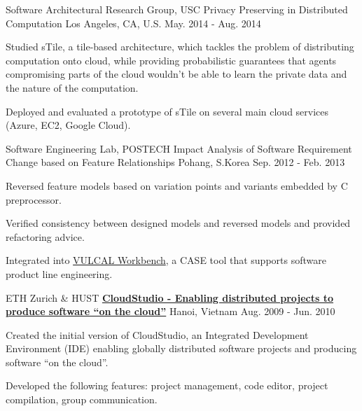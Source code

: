 \begin{cventries}
\cventry
{{Software Architectural Research Group}, USC} %
{Privacy Preserving in Distributed Computation} %
{Los Angeles, CA, U.S.} %
{May. 2014 - Aug. 2014} %
{
  	\begin{cvitems} %
  		\item Studied sTile, a tile-based architecture, which tackles the problem of distributing computation onto cloud, while providing probabilistic guarantees that agents compromising parts of the cloud wouldn't be able to learn the private data and the nature of the computation.
  		\item Deployed and evaluated a prototype of sTile on several main cloud services (Azure, EC2, Google Cloud).
  	\end{cvitems}
}
  \cventry
    {Software Engineering Lab, POSTECH } %
    {Impact Analysis of Software Requirement Change based on Feature Relationships} %
    {Pohang, S.Korea} %
    {Sep. 2012 - Feb. 2013} %
    {
      \begin{cvitems} %
        \item Reversed feature models based on variation points and variants embedded by C preprocessor.
        \item Verified consistency between designed models and reversed models and provided refactoring advice.
        \item Integrated into \href{http://productlinetech.com}{VULCAL Workbench}, a CASE tool that supports software product line engineering.
      \end{cvitems} 
    }
    
  \cventry
    {{ETH Zurich} \&  HUST} %
    {\href{http://se.inf.ethz.ch/research/cloudstudio/}{\bf CloudStudio - Enabling distributed projects to produce software “on the cloud”}} %
    {Hanoi, Vietnam} %
    {Aug. 2009 - Jun. 2010} %
    {
      \begin{cvitems} %
       \item Created the initial version of CloudStudio, an Integrated Development Environment (IDE) enabling globally distributed software projects and producing software ``on the cloud”.
       \item Developed the following features: project management, code editor, project compilation, group communication.
      \end{cvitems}
    }

\end{cventries}
